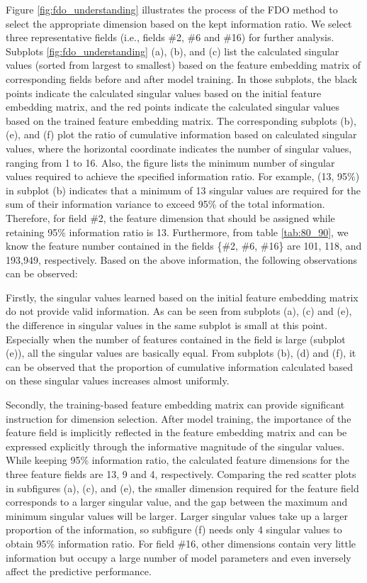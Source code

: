 \documentclass[sigconf]{acmart}
\begin{document}
Figure \ref{fig:fdo_understanding} illustrates the process of the FDO method to select the appropriate dimension based on the kept information ratio. We select three representative fields (i.e., fields {\#2, \#6 and \#16}) for further analysis. Subplots \ref{fig:fdo_understanding} (a), (b), and (c) list the calculated singular values (sorted from largest to smallest) based on the feature embedding matrix of corresponding fields before and after model training. In those subplots, the black points indicate the calculated singular values based on the initial feature embedding matrix, and the red points indicate the calculated singular values based on the trained feature embedding matrix. The corresponding subplots (b), (e), and (f) plot the ratio of cumulative information based on calculated singular values, where the horizontal coordinate indicates the number of singular values, ranging from 1 to 16. Also, the figure lists the minimum number of singular values required to achieve the specified information ratio. For example, (13, 95\%) in subplot (b) indicates that a minimum of 13 singular values are required for the sum of their information variance to exceed 95\% of the total information. Therefore, for field \#2, the feature dimension that should be assigned while retaining 95\% information ratio is 13. Furthermore, from table \ref{tab:80_90}, we know the feature number contained in the fields \{\#2, \#6, \#16\} are 101, 118, and 193,949, respectively. Based on the above information, the following observations can be observed:

Firstly, the singular values learned based on the initial feature embedding matrix do not provide valid information. As can be seen from subplots (a), (c) and (e), the difference in singular values in the same subplot is small at this point. Especially when the number of features contained in the field is large (subplot (e)), all the singular values are basically equal. From subplots (b), (d) and (f), it can be observed that the proportion of cumulative information calculated based on these singular values increases almost uniformly.

Secondly, the training-based feature embedding matrix can provide significant instruction for dimension selection. After model training, the importance of the feature field is implicitly reflected in the feature embedding matrix and can be expressed explicitly through the informative magnitude of the singular values. While keeping 95\% information ratio, the calculated feature dimensions for the three feature fields are 13, 9 and 4, respectively. Comparing the red scatter plots in subfigures (a), (c), and (e), the smaller dimension required for the feature field corresponds to a larger singular value, and the gap between the maximum and minimum singular values will be larger. Larger singular values take up a larger proportion of the information, so subfigure (f) needs only 4 singular values to obtain 95\% information ratio. For field \#16, other dimensions contain very little information but occupy a large number of model parameters and even inversely affect the predictive performance. 
\end{document}
